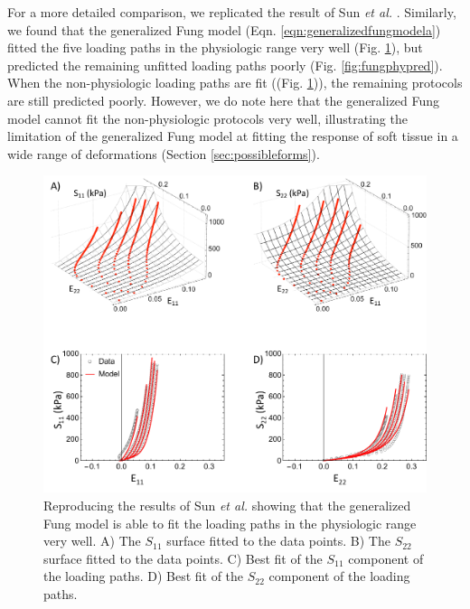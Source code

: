     For a more detailed comparison, we replicated the result of Sun \textit{et al.} \cite{sun_biaxial_2003}. Similarly, we found that the generalized Fung model (Eqn. \ref{eqn:generalizedfungmodela}) fitted the five loading paths in the physiologic range very well (Fig. \ref{fig:fungphyfit}), but predicted the remaining unfitted loading paths poorly (Fig. \ref{fig:fungphypred}). When the non-physiologic loading paths are fit ((Fig. \ref{fig:fungphyfit})), the remaining protocols are still predicted poorly. However, we do note here that the generalized Fung model cannot fit the non-physiologic protocols very well, illustrating the limitation of the generalized Fung model at fitting the response of soft tissue in a wide range of deformations (Section \ref{sec:possibleforms}). 

\begin{figure}[hptb]
\centering
\includegraphics[width=\textwidth]{Images/chapter5/fungphyfit}
\caption{Reproducing the results of Sun \textit{et al.} \cite{sun_biaxial_2003} showing that the generalized Fung model is able to fit the loading paths in the physiologic range very well. A) The $S_{11}$ surface fitted to the data points. B) The $S_{22}$ surface fitted to the data points. C) Best fit of the $S_{11}$ component of the loading paths. D) Best fit of the $S_{22}$ component of the loading paths.}
\label{fig:fungphyfit}
\end{figure} 

